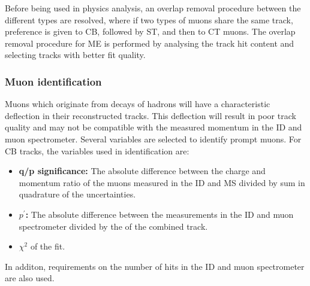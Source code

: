 Before being used in physics analysis, an overlap removal procedure between the different types are resolved, where if two types of muons share the same track, preference is given to CB, followed by ST, and then to CT muons. The overlap removal procedure for ME is performed by analysing the track hit content and selecting tracks with better fit quality. 

\subsubsection{Muon identification}
Muons which originate from decays of hadrons will have a characteristic deflection in their reconstructed tracks. This deflection will result in poor track quality and may not be compatible with the measured momentum in the ID and muon spectrometer. Several variables are selected to identify prompt muons. For CB tracks, the variables used in identification are:
\begin{itemize}
    \item \textbf{q/p significance:} The absolute difference between the charge and momentum ratio of the muons measured in the ID and MS divided by sum in quadrature of the uncertainties. 
    \item \textbf{$p^\prime$:} The absolute difference between the \pt measurements in the ID and muon spectrometer divided by the \pt of the combined track.
    \item $\chi^2$ of the fit.
\end{itemize}
In additon, requirements on the number of hits in the ID and muon spectrometer are also used. 

